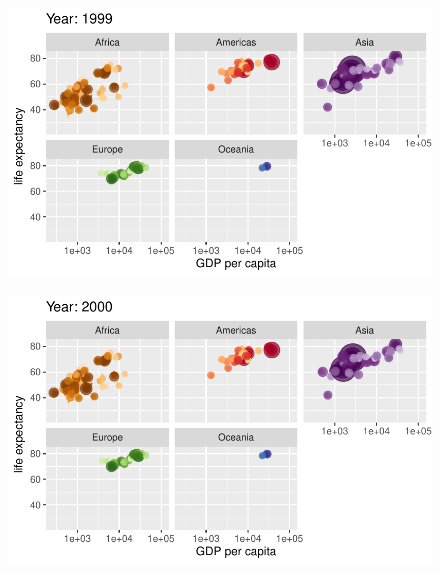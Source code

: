 \documentclass[
  letterpaper,
  DIV=11,
  numbers=noendperiod]{scrartcl}
\begin{document}
\begin{figure}[H]

{\centering \includegraphics{class05_files/figure-pdf/unnamed-chunk-24-86.pdf}

}

\end{figure}

\begin{figure}[H]

{\centering \includegraphics{class05_files/figure-pdf/unnamed-chunk-24-87.pdf}

}

\end{figure}
\end{document}

